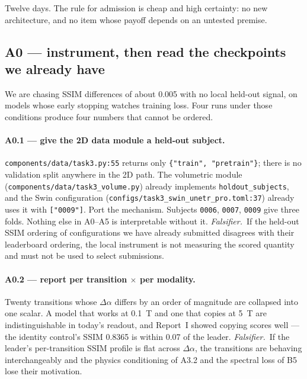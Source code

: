 \documentclass[11pt,a4paper]{article}
\newcommand{\reportone}{Report~I}
\newcommand{\fals}{\textit{Falsifier.}\ }
\begin{document}
Twelve days. The rule for admission is cheap and high certainty: no new architecture, and no item whose
payoff depends on an untested premise.

\subsection{A0 --- instrument, then read the checkpoints we already have}
\label{sec:A0}

We are chasing SSIM differences of about \num{0.005} with no local held-out signal, on models whose early
stopping watches training loss. Four runs under those conditions produce four numbers that cannot be
ordered.

\paragraph{A0.1 --- give the 2D data module a held-out subject.}
\texttt{components/data/task3.py:55} returns only \texttt{\{"train", "pretrain"\}}; there is no
validation split anywhere in the 2D path. The volumetric module
(\texttt{components/data/\allowbreak task3\_volume.py}) already implements \texttt{holdout\_subjects}, and
the Swin configuration (\texttt{configs/\allowbreak task3\_swin\_unetr\_pro.toml:37}) already uses it with
\texttt{["0009"]}. Port the mechanism. Subjects \texttt{0006}, \texttt{0007}, \texttt{0009} give three
folds. Nothing else in A0--A5 is interpretable without it.
\fals If the held-out SSIM ordering of configurations we have already submitted disagrees with their
leaderboard ordering, the local instrument is not measuring the scored quantity and must not be used to
select submissions.

\paragraph{A0.2 --- report per transition \texorpdfstring{$\times$}{x} per modality.} Twenty transitions
whose $\Delta\alpha$ differs by an order of magnitude are collapsed into one scalar. A model that works
at \SI{0.1}{\tesla} and one that copies at \SI{5}{\tesla} are indistinguishable in today's readout, and
\reportone{} showed copying scores well --- the identity control's SSIM \num{0.8365} is within
\num{0.07} of the leader.
\fals If the leader's per-transition SSIM profile is flat across $\Delta\alpha$, the transitions are
behaving interchangeably and the physics conditioning of A3.2 and the spectral loss of B5 lose their
motivation.
\end{document}
